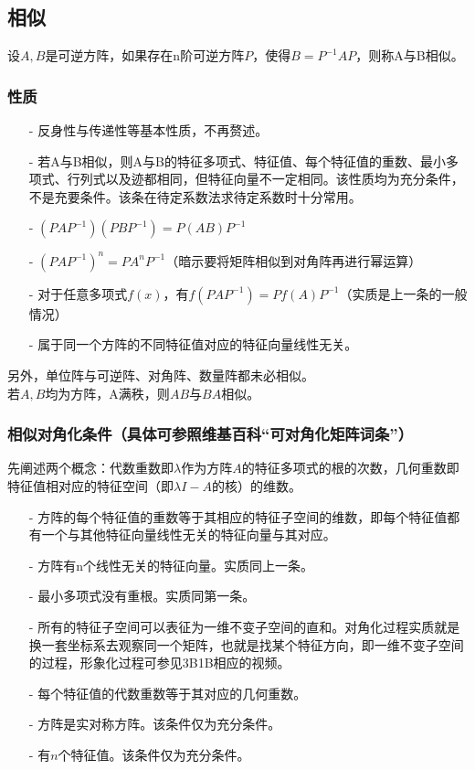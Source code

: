 \documentclass[UTF8]{ctexart}
\begin{document}
\subsection{相似}
设$A,B$是可逆方阵，如果存在n阶可逆方阵$P$，使得$B=P^{-1}AP$，则称A与B相似。
\subsubsection{性质}
\begin{itemize}
	\item [-]反身性与传递性等基本性质，不再赘述。
	\item [-]若A与B相似，则A与B的特征多项式、特征值、每个特征值的重数、最小多项式、行列式以及迹都相同，但特征向量不一定相同。该性质均为充分条件，不是充要条件。该条在待定系数法求待定系数时十分常用。
	\item [-]$(PAP^{-1})(PBP^{-1})=P(AB)P^{-1}$
	\item [-]$(PAP^{-1})^{n}=PA^{n}P^{-1}$（暗示要将矩阵相似到对角阵再进行幂运算）
	\item [-]对于任意多项式$f(x)$，有$f(PAP^{-1})=Pf(A)P^{-1}$（实质是上一条的一般情况）
	\item [-]属于同一个方阵的不同特征值对应的特征向量线性无关。
\end{itemize}
另外，单位阵与可逆阵、对角阵、数量阵都未必相似。\\
\indent
若$A,B$均为方阵，A满秩，则$AB$与$BA$相似。
\subsubsection{相似对角化条件（具体可参照维基百科“可对角化矩阵词条”）}
先阐述两个概念：代数重数即$\lambda$作为方阵$A$的特征多项式的根的次数，几何重数即特征值相对应的特征空间（即$\lambda I -A$的核）的维数。
\begin{itemize}
	\item [-]方阵的每个特征值的重数等于其相应的特征子空间的维数，即每个特征值都有一个与其他特征向量线性无关的特征向量与其对应。
	\item [-]方阵有n个线性无关的特征向量。实质同上一条。
	\item [-]最小多项式没有重根。实质同第一条。
	\item [-]所有的特征子空间可以表征为一维不变子空间的直和。对角化过程实质就是换一套坐标系去观察同一个矩阵，也就是找某个特征方向，即一维不变子空间的过程，形象化过程可参见3B1B相应的视频。
	\item [-]每个特征值的代数重数等于其对应的几何重数。
	\item [-]方阵是实对称方阵。该条件仅为充分条件。
    \item [-]有$n$个特征值。该条件仅为充分条件。
\end{itemize}
\end{document}
